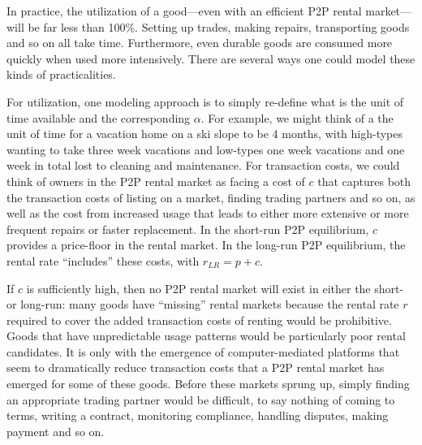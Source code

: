 
In practice, the utilization of a good---even with an efficient P2P rental market---will be far less than 100\%.
Setting up trades, making repairs, transporting goods and so on all take time.  
Furthermore, even durable goods are consumed more quickly when used more intensively. 
There are several ways one could model these kinds of practicalities. 

For utilization, one modeling approach is to simply re-define what is the unit of time available and the corresponding $\alpha$. 
For example, we might think of a the unit of time for a vacation home on a ski slope to be 4 months, with high-types wanting to take three week vacations and low-types one week vacations and one week in total lost to cleaning and maintenance.      
For transaction costs, we could think of owners in the P2P rental market as facing a cost of $c$ that captures both the transaction costs of listing on a market, finding trading partners and so on, as well as the cost from increased usage that leads to either more extensive or more frequent repairs or faster replacement.
In the short-run P2P equilibrium, $c$ provides a price-floor in the rental market.  
In the long-run P2P equilibrium, the rental rate ``includes'' these costs, with $r_{LR} = p + c$. 

If $c$ is sufficiently high, then no P2P rental market will exist in either the short- or long-run: 
many goods have ``missing'' rental markets because the rental rate $r$ required to cover the added transaction costs of renting would be prohibitive.
Goods that have unpredictable usage patterns would be particularly poor rental candidates.  
It is only with the emergence of computer-mediated platforms that seem to dramatically reduce transaction costs that a P2P rental market has emerged for some of these goods. 
Before these markets sprung up, simply finding an appropriate trading partner would be difficult, to say nothing of coming to terms, writing a contract, monitoring compliance, handling disputes, making payment and so on. 



